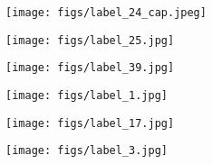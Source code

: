 \documentclass[10pt,twocolumn,letterpaper]{article}
\begin{document}
\begin{figure}[!t]
    \begin{subfigure}{0.17\linewidth}
        \centering
        \texttt{[image: figs/label\_24\_cap.jpeg]}
        \vspace{-5mm}
    \end{subfigure}
    \begin{subfigure}{0.132\linewidth}
        \centering
        \texttt{[image: figs/label\_25.jpg]}
        \vspace{-5mm}
    \end{subfigure}
    \begin{subfigure}{0.142\linewidth}
        \centering
        \texttt{[image: figs/label\_39.jpg]}
        \vspace{-5mm}
    \end{subfigure}
    \begin{subfigure}{0.142\linewidth}
        \centering
        \texttt{[image: figs/label\_1.jpg]}
        \vspace{-5mm}
    \end{subfigure}
    \begin{subfigure}{0.136\linewidth}
        \centering
        \texttt{[image: figs/label\_17.jpg]}
        \vspace{-5mm}
    \end{subfigure}
    \begin{subfigure}{0.135\linewidth}
        \centering
        \texttt{[image: figs/label\_3.jpg]}
        \vspace{-5mm}
    \end{subfigure}


\end{figure}
\end{document}
